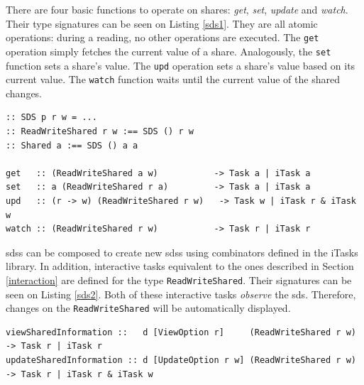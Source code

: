 There are four basic functions to operate on shares: \textit{get}, \textit{set}, \textit{update} and \textit{watch}. Their type signatures can be seen on Listing \ref{sds1}. They are all atomic operations: during a reading, no other operations are executed. The \texttt{get} operation simply fetches the current value of a share. Analogously, the \texttt{set} function sets a share's value. The \texttt{upd} operation sets a share's value based on its current value. The \texttt{watch} function waits until the current value of the shared changes.

\begin{lstlisting}[caption=Shared Data Sources definitions,label=sds1,captionpos=b]
:: SDS p r w = ...
:: ReadWriteShared r w :== SDS () r w
:: Shared a :== SDS () a a

get   :: (ReadWriteShared a w)           -> Task a | iTask a
set   :: a (ReadWriteShared r a)         -> Task a | iTask a
upd   :: (r -> w) (ReadWriteShared r w)   -> Task w | iTask r & iTask w
watch :: (ReadWriteShared r w)           -> Task r | iTask r
\end{lstlisting}

\acp{sds} can be composed to create new \acp{sds} using combinators defined in the iTasks library. In addition, interactive tasks equivalent to the ones described in Section \ref{interaction} are defined for the type \texttt{ReadWriteShared}. Their signatures can be seen on Listing \ref{sds2}. Both of these interactive tasks \textit{observe} the \ac{sds}. Therefore, changes on the \texttt{ReadWriteShared} will be automatically displayed.

\begin{lstlisting}[caption=\ac{sds} interactive tasks,label=sds2,captionpos=b]
viewSharedInformation ::   d [ViewOption r]     (ReadWriteShared r w) -> Task r | iTask r 
updateSharedInformation :: d [UpdateOption r w] (ReadWriteShared r w) -> Task r | iTask r & iTask w
\end{lstlisting}
